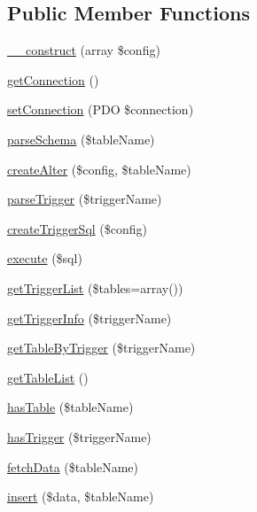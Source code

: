 \subsection*{Public Member Functions}
\begin{DoxyCompactItemize}
\item 
\hyperlink{classDbSync__DbAdapter__Mysql_abf098ec8f68514927dacce23e5a30030}{\_\-\_\-construct} (array \$config)
\item 
\hyperlink{classDbSync__DbAdapter__Mysql_a710f43c8e7cacc9ce8b131b4c0bd9107}{getConnection} ()
\item 
\hyperlink{classDbSync__DbAdapter__Mysql_a62b30dac592a365506212d632a26db1e}{setConnection} (PDO \$connection)
\item 
\hyperlink{classDbSync__DbAdapter__Mysql_a1eeb0ab74018b405fdd42ba5c37adc2d}{parseSchema} (\$tableName)
\item 
\hyperlink{classDbSync__DbAdapter__Mysql_a51b9a8196dcbef50547417d4fe8a0666}{createAlter} (\$config, \$tableName)
\item 
\hyperlink{classDbSync__DbAdapter__Mysql_acf8d25625a74af2fe9f31e4b621ef0f0}{parseTrigger} (\$triggerName)
\item 
\hyperlink{classDbSync__DbAdapter__Mysql_af58ff620be0d1f4cac9b865ca0000fcf}{createTriggerSql} (\$config)
\item 
\hyperlink{classDbSync__DbAdapter__Mysql_a279036935ed06d1cd41c4ec1d8b107cc}{execute} (\$sql)
\item 
\hyperlink{classDbSync__DbAdapter__Mysql_a2b2b495a76b6cd7f3eda1b5b41614f58}{getTriggerList} (\$tables=array())
\item 
\hyperlink{classDbSync__DbAdapter__Mysql_a56ad5c72bea44503e76ee2aeb7be8db4}{getTriggerInfo} (\$triggerName)
\item 
\hyperlink{classDbSync__DbAdapter__Mysql_a1bb1fb6762c987d2bdcd243c37875a54}{getTableByTrigger} (\$triggerName)
\item 
\hyperlink{classDbSync__DbAdapter__Mysql_ab6a45a23420b3f1e5817fbe287c53842}{getTableList} ()
\item 
\hyperlink{classDbSync__DbAdapter__Mysql_aceee5101dd14398aa51b7f3abfe88306}{hasTable} (\$tableName)
\item 
\hyperlink{classDbSync__DbAdapter__Mysql_a7c89b938e8554a37e1244207cb75b3ff}{hasTrigger} (\$triggerName)
\item 
\hyperlink{classDbSync__DbAdapter__Mysql_a76d3e3c3e80fee76c7057724a55a8d58}{fetchData} (\$tableName)
\item 
\hyperlink{classDbSync__DbAdapter__Mysql_a5f9f2976276f71419539cb1da154f5de}{insert} (\$data, \$tableName)

\end{DoxyCompactItemize}

